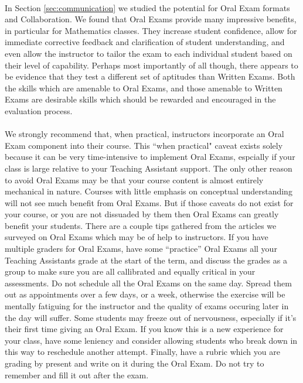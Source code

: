 \documentclass[12pt]{article}
\begin{document}
\paragraph{}
In Section \ref{sec:communication} we studied the potential for Oral Exam formats and Collaboration. We found that Oral Exams provide many impressive benefits, in particular for Mathematics classes. They increase student confidence, allow for immediate corrective feedback and clarification of student understanding, and even allow the instructor to tailor the exam to each individual student based on their level of capability. Perhaps most importantly of all though, there appears to be evidence that they test a different set of aptitudes than Written Exams. Both the skills which are amenable to Oral Exams, and those amenable to Written Exams are desirable skills which should be rewarded and encouraged in the evaluation process.
\paragraph{}
We strongly recommend that, when practical, instructors incorporate an Oral Exam component into their course. This ``when practical" caveat exists solely because it can be very time-intensive to implement Oral Exams, espcially if your class is large relative to your Teaching Assistant support. The only other reason to avoid Oral Exams may be that your course content is almost entirely mechanical in nature. Courses with little emphasis on conceptual understanding will not see much benefit from Oral Exams. But if those caveats do not exist for your course, or you are not dissuaded by them then Oral Exams can greatly benefit your students. There are a couple tips gathered from the articles we surveyed on Oral Exams which may be of help to instructors. If you have multiple graders for Oral Exams, have some ``practice'' Oral Exams all your Teaching Assistants grade at the start of the term, and discuss the grades as a group to make sure you are all callibrated and equally critical in your assessments. Do not schedule all the Oral Exams on the same day. Spread them out as appointments over a few days, or a week, otherwise the exercise will be mentally fatiguing for the instructor and the quality of exams occuring later in the day will suffer. Some students may freeze out of nervousness, especially if it's their first time giving an Oral Exam. If you know this is a new experience for your class, have some leniency and consider allowing students who break down in this way to reschedule another attempt. Finally, have a rubric which you are grading by present and write on it during the Oral Exam. Do not try to remember and fill it out after the exam. 
\end{document}

